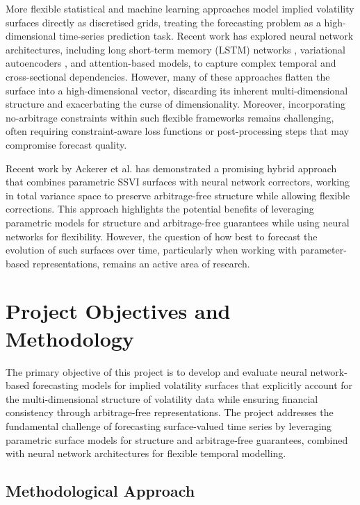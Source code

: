More flexible statistical and machine learning approaches model implied volatility surfaces directly as discretised grids, treating the forecasting problem as a high-dimensional time-series prediction task. Recent work has explored neural network architectures, including long short-term memory (LSTM) networks \cite{AckTagVat:20}, variational autoencoders \cite{Bergeron:21}, and attention-based models, to capture complex temporal and cross-sectional dependencies. However, many of these approaches flatten the surface into a high-dimensional vector, discarding its inherent multi-dimensional structure and exacerbating the curse of dimensionality. Moreover, incorporating no-arbitrage constraints within such flexible frameworks remains challenging, often requiring constraint-aware loss functions or post-processing steps that may compromise forecast quality.

Recent work by Ackerer et al. \cite{AckTagVat:20} has demonstrated a promising hybrid approach that combines parametric SSVI surfaces with neural network correctors, working in total variance space to preserve arbitrage-free structure while allowing flexible corrections. This approach highlights the potential benefits of leveraging parametric models for structure and arbitrage-free guarantees while using neural networks for flexibility. However, the question of how best to forecast the evolution of such surfaces over time, particularly when working with parameter-based representations, remains an active area of research.

\section{Project Objectives and Methodology}

The primary objective of this project is to develop and evaluate neural network-based forecasting models for implied volatility surfaces that explicitly account for the multi-dimensional structure of volatility data while ensuring financial consistency through arbitrage-free representations. The project addresses the fundamental challenge of forecasting surface-valued time series by leveraging parametric surface models for structure and arbitrage-free guarantees, combined with neural network architectures for flexible temporal modelling.

\subsection{Methodological Approach}

